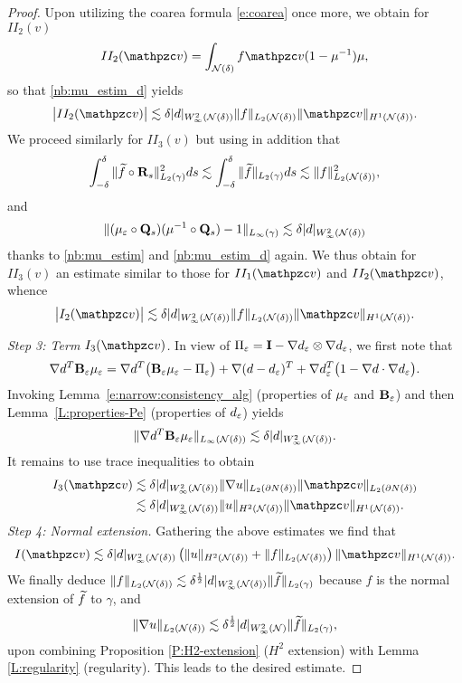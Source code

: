 \begin{proof}
Upon utilizing the coarea formula \eqref{e:coarea} once more,  we obtain for $II_2(v)$
%
\[
II_2(\tv) = \int_\Nd f \tv (1-\mu^{-1})\mu,
\]
so that
\eqref{nb:mu_estim_d} yields
\[
\big| II_2(\tv)  \big| \lesssim
\delta  |d|_{W^2_\infty(\Nd)} \|f\|_{L_2(\Nd)} \|\tv\|_{H^1(\Nd)}.
\]
We proceed similarly for $II_3(v)$ but using in addition that
$$
\int_{-\delta}^\delta \|  \widetilde{f} \circ {\mathbf{R}_s} \|_{L_2(\gamma)}^2 ds
\lesssim \int_{-\delta}^\delta \| \widetilde{f} \|_{L_2(\gamma)} ds \lesssim
\|f\|_{L_2({\mathcal{N}(\delta)})}^2,
$$
and
$$
\|  ({\mu_{\varepsilon}} \circ {\mathbf{Q}_s}) (\mu^{-1} \circ {\mathbf{Q}_s}) - 1\|_{L_\infty(\gamma)} \lesssim \delta  |d|_{W^2_\infty({\mathcal{N}(\delta)})}
$$
thanks to \eqref{nb:mu_estim} and \eqref{nb:mu_estim_d} again. We thus obtain for
$II_3(v)$ an estimate similar to those for $II_1(\tv)$ and $II_2(\tv)$, whence
%
\[
\big| I_2(\tv)  \big| \lesssim
\delta  |d|_{W^2_\infty(\Nd)} \|f\|_{L_2(\Nd)} \|\tv\|_{H^1(\Nd)}.
\]

\noindent
 {\it Step 3: Term $I_3(\tv)$.} In view of $\Pi_{\varepsilon}={\bf I}-\nabla d_\varepsilon\otimes\nabla d_\varepsilon$,
 we first note that
%
\[
\nabla d^T {\bf B}_\varepsilon \mu_{\varepsilon} = \nabla d^T \big( {\bf B}_\varepsilon {\mu_{\ensuremath{\varepsilon}}} - \Pi_{\varepsilon}\big)
+ \nabla(d-d_\varepsilon)^T + \nabla d_\varepsilon^T \big( 1 - \nabla d \cdot \nabla d_\varepsilon  \big).
\]
%
Invoking Lemma~\ref{e:narrow:consistency_alg} (properties of ${\mu_{\varepsilon}}$ and ${\mathbf{B}_\varepsilon}$)
and then Lemma~\ref{L:properties-Pe} (properties of $d_\varepsilon$) yields
%
$$
\| \nabla d^T {\bf B}_\varepsilon \mu_{\varepsilon} \|_{L_\infty(\mathcal N(\delta))} \lesssim
\delta |d|_{W^2_\infty({\mathcal{N}(\delta)})}.
$$
%
It remains to use trace inequalities  to obtain
%
\begin{align*}
I_3(\tv) &\lesssim \delta |d|_{W^2_\infty(\Nd)} \| \nabla u \|_{L_2(\partial N(\delta))} \| \tv \|_{L_2(\partial N(\delta))}
  \\&
\lesssim \delta |d|_{W^2_\infty(\Nd)} \| u \|_{H^2(\mathcal N(\delta))} \| \tv \|_{H^1(\mathcal N(\delta))}.
\end{align*}
%
\medskip\noindent
 {\it Step 4: Normal extension.} Gathering the above estimates we find that
$$
I(\tv) \lesssim \delta |d|_{W^2_\infty(\Nd)} \left(\| u \|_{H^2(\mathcal N(\delta))}+ \| f \|_{L_2(\mathcal N(\delta))}\right) \| \tv \|_{H^1(\mathcal N(\delta))}.
$$
%
We finally deduce 
$\|f\|_{L_2({\mathcal{N}(\delta)})} \lesssim \delta^{\frac12} |d|_{W^2_\infty({\mathcal{N}(\delta)})}\|\widetilde{f}\|_{L_2(\gamma)}$
because $f$ is the normal extension of $\widetilde{f}$ to $\gamma$, and
%
\[
\|\nabla u\|_{L_2({\mathcal{N}(\delta)})} \lesssim \delta^{\frac12} |d|_{W^2_\infty(\mathcal{N})}
\|\widetilde{f}\|_{L_2(\gamma)},
\]
%
upon combining Proposition \ref{P:H2-extension} ($H^2$ extension) with
Lemma \ref{L:regularity} (regularity). This leads to the desired estimate.
%
\end{proof}

